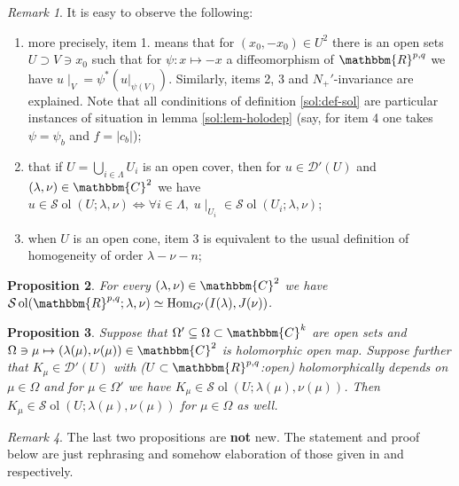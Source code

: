\documentclass{article}
\newcommand{\tmop}[1]{\ensuremath{\operatorname{#1}}}
\newcommand{\tmtextbf}[1]{{\bfseries{#1}}}
\newtheorem{proposition}{Proposition}[section]
\theoremstyle{remark}
\newtheorem{remark}[proposition]{Remark}
\begin{document}
\begin{remark}
  It is easy to observe the following:
  \begin{enumerate}
    \item more precisely, item 1. means that for $(x_0, - x_0) \in U^2$ there
    is an open sets $U \supset V \ni x_0$ such that for $\psi : x \mapsto - x$
    a diffeomorphism of $\mathbbm{R}^{p, q}$ we have $u \mid_V =
    \psi^{\ast} (u |_{\psi (V)})$. Similarly, items 2, 3 and $N_+'$-invariance
    are explained. Note that all condinitions of definition \ref{sol:def-sol}
    are particular instances of situation in lemma \ref{sol:lem-holodep} (say,
    for item 4 one takes $\psi = \psi_b$ and $f = | c_b |$);
    
    \item that if $U = \bigcup_{i \in \Lambda} U_i$ is an open cover, then for
    $u \in \mathcal{D}' (U)$ and $(\lambda, \nu) \in \mathbbm{C}^2$ we have $u
    \in \mathcal{S} \tmop{ol} (U ; \lambda, \nu) \Leftrightarrow \forall i \in
    \Lambda, \; u \mid_{U_i} \in \mathcal{S} \tmop{ol} (U_i ; \lambda,
    \nu)$;
    
    \item when $U$ is an open cone, item 3 is equivalent to the usual
    definition of homogeneity of order $\lambda - \nu - n$;
  \end{enumerate}
\end{remark}

\begin{proposition}
  \label{sol:prop-sol}For every $(\lambda, \nu) \in \mathbbm{C}^2$ we have
  $\mathcal{S} \tmop{ol} (\mathbbm{R}^{p, q} ; \lambda, \nu) \simeq
  \tmop{Hom}_{G'} (I (\lambda), J (\nu))$.
\end{proposition}

\begin{proposition}
  \label{sol:prop-holocont}Suppose that $\Omega' \subseteq \Omega \subset
  \mathbbm{C}^k$ are open sets and $\Omega \ni \mu \mapsto (\lambda (\mu), \nu
  (\mu)) \in \mathbbm{C}^2$ is holomorphic open map. Suppose further that
  $K_{\mu} \in \mathcal{D}' (U)$ with ($U \subset \mathbbm{R}^{p, q}$:open)
  holomorphically depends on $\mu \in \Omega$ and for $\mu \in \Omega'$ we
  have $K_{\mu} \in \mathcal{S} \tmop{ol} (U ; \lambda (\mu), \nu (\mu))$.
  Then $K_{\mu} \in \mathcal{S} \tmop{ol} (U ; \lambda (\mu), \nu (\mu))$ for
  $\mu \in \Omega$ as well.
\end{proposition}

\begin{remark}
  The last two propositions are \tmtextbf{not} new. The statement and proof
  below are just rephrasing and somehow elaboration of those given in
  {\cite[thm 3.16]{kobayashi2015symmetry}} and {\cite[prop.
  3.18]{kobayashi2015symmetry}} respectively.
\end{remark}
\end{document}
